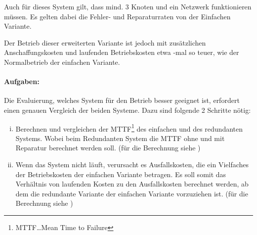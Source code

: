 \documentclass[
            a4paper
            ]{scrartcl}%
\newcommand{\printCostFactor}{\pgfmathparse{\costFactor}\pgfmathprintnumber[fixed,
precision=1]{\pgfmathresult}}
\begin{document}
Auch für dieses System gilt, dass mind. 3 Knoten und ein Netzwerk funktionieren
müssen. Es gelten dabei die Fehler- und Reparaturraten von der Einfachen
Variante.

Der Betrieb dieser erweiterten Variante ist jedoch mit zusätzlichen
Anschaffungskosten und laufenden Betriebskosten etwa \printCostFactor-mal so
teuer, wie der Normalbetrieb der einfachen Variante.

\paragraph{Aufgaben:} Die Evaluierung, welches System für den Betrieb besser geeignet ist,
erfordert einen genauen Vergleich der beiden Systeme. Dazu sind folgende 2
Schritte nötig:
\begin{enumerate}[i)]
    \item Berechnen und vergleichen der MTTF\footnote{MTTF\dots Mean Time to
        Failure} des einfachen und des redundanten Systems. Wobei beim
        Redundanten System die MTTF ohne und mit Reparatur berechnet werden
        soll. (für die Berechnung siehe )
    \item Wenn das System nicht läuft, verursacht es Ausfallskosten, die ein
        Vielfaches der Betriebskosten der einfachen Variante betragen. 
        Es soll somit das Verhältnis von laufenden Kosten zu den Ausfallskosten
        berechnet werden, ab dem die redundante Variante der einfachen Variante
        vorzuziehen ist. (für die Berechnung siehe )
\end{enumerate}
\end{document}
